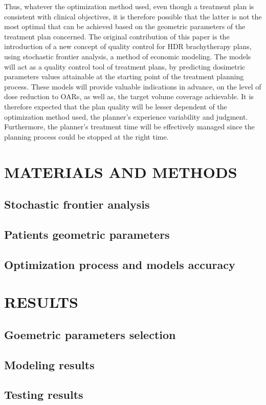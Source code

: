 Thus, whatever the optimization method used, even though a treatment plan is consistent with clinical objectives, it is therefore possible that the latter is not the most optimal that can be achieved based on the geometric parameters of the treatment plan concerned. \newline
The original contribution of this paper is the introduction of a new concept of quality control for HDR brachytherapy plans, using stochastic frontier analysis, a method of economic modeling. The models will act as a quality control tool of treatment plans, by predicting dosimetric parameters values attainable at the starting point of the treatment planning process. These models will provide valuable indications in advance, on the level of dose reduction to OARs, as well as, the target volume coverage achievable. It is therefore expected that the plan quality will be lesser dependent of the optimization method used, the planner's experience variability and judgment. Furthermore, the planner's treatment time will be effectively managed since the planning process could be stopped at the right time.
%
\section{MATERIALS AND METHODS}
%
\subsection{Stochastic frontier analysis}
%
\subsection{Patients geometric parameters}
%
\subsection{Optimization process and models accuracy}
%
\section{RESULTS}
\subsection{Goemetric parameters selection}
%
\subsection{Modeling results}
%
\subsection{Testing results}
%
